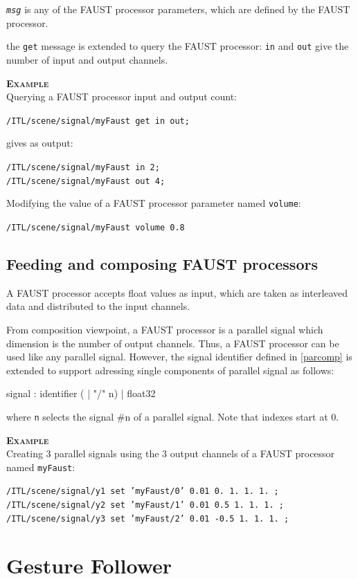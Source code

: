 \documentclass[a4paper,twoside]{report}
\newcommand{\sublevel}[1]	{\section{#1}}
\newcommand{\subsublevel}[1]	{\subsection{#1}}
\newcommand{\OSC}[1]		{\texttt{#1}}
\newcommand{\values}[1]		{\texttt{#1}}
\newcommand{\example}		{\textbf{\hspace{-1.5cm}\textbf{\textsc{Example }}}}
\let\olditemize\itemize
\let\oldenditemize\enditemize
\renewenvironment{itemize} 	{\olditemize \setlength{\itemsep}{1mm}}{\oldenditemize}
\newcommand{\sample}	[1]			{\vspace{-2mm}\begin{center}\colorbox{mygrey}{
								\begin{minipage}[t]{0.9\columnwidth} 
								{\small \texttt{#1}}
								\end{minipage}}\end{center}}
\newcommand{\sampleindent}	{ \hspace{0.5cm} }
\begin{document}
\begin{itemize}
\item [1] \OSC{\emph{msg}} is any of the FAUST processor parameters, which are defined by the FAUST processor.
\item [2] the \OSC{get} message is extended to query the FAUST processor: \OSC{in} and \OSC{out} give the number of input and output channels.
\end{itemize}

\example \\
Querying a FAUST processor input and output count:
\sample{/ITL/scene/signal/myFaust get in out;}
\sampleindent gives as output:
\sample{/ITL/scene/signal/myFaust in 2; \\
/ITL/scene/signal/myFaust out 4;
}
Modifying the value of a FAUST processor parameter named \OSC{volume}:
\sample{/ITL/scene/signal/myFaust volume 0.8}

\subsublevel{Feeding and composing FAUST processors}
\label{composefaust}

A FAUST processor accepts float values as input, which are taken as interleaved data and distributed to the input channels.

From composition viewpoint, a FAUST processor is a parallel signal which dimension is the number of output channels. 
Thus, a FAUST processor can be used like any parallel signal. However, the signal identifier defined in \ref{parcomp} is extended to support adressing single components of parallel signal as follows:
\begin{rail}
signal :  
		  identifier ( | "/" n)
		| float32
\end{rail}
where \values{n} selects the signal \#n of a parallel signal. Note that indexes start at 0.

\example \\
Creating 3 parallel signals using the 3 output channels of a FAUST processor named \OSC{myFaust}:
\sample{/ITL/scene/signal/y1 set 'myFaust/0' 0.01 0. 1. 1. 1. ;\\
/ITL/scene/signal/y2 set 'myFaust/1' 0.01 0.5 1. 1. 1. ;\\
/ITL/scene/signal/y3 set 'myFaust/2' 0.01 -0.5 1. 1. 1. ;
}


\sublevel{Gesture Follower}
\label{GF}
\end{document}
